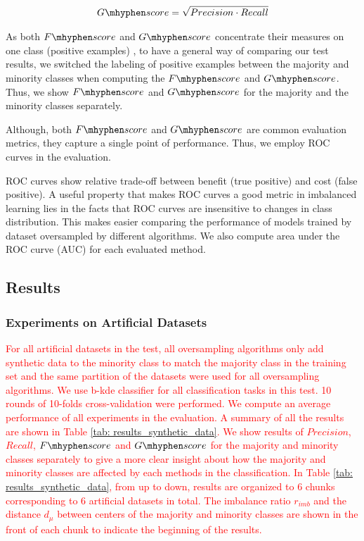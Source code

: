 \documentclass[10pt,journal,compsoc]{IEEEtran}
\newcommand\fscore{\mathop{F\mhyphen score}}
\newcommand\gscore{\mathop{G\mhyphen score}}
\begin{document}
\begin{align*}
\gscore=\sqrt{Precision \cdot Recall}
\end{align*}

As both $\fscore$ and $\gscore$ concentrate their measures on one class (positive examples) \cite{sokolova2006beyond}, to have a general way of comparing our test results, we switched the labeling of positive examples between the majority and minority classes when computing the $\fscore$ and $\gscore$. Thus, we show $\fscore$ and $\gscore$ for the majority and the minority classes separately.

Although, both $\fscore$ and $\gscore$ are common evaluation metrics, they capture a single point of performance. Thus, we employ ROC curves \cite{fawcett2004roc}\cite{fawcett2006introduction}\cite{mohri2005confidence} in the evaluation.

ROC curves show relative trade-off between benefit (true positive) and cost (false positive). A useful property that makes ROC curves a good metric in imbalanced learning lies in the facts that ROC curves are insensitive to changes in class distribution. This makes easier comparing the performance of models trained by dataset oversampled by different algorithms. We also compute area under the ROC curve (AUC) for each evaluated method.
 
 
\subsection{Results}
\subsubsection{Experiments on Artificial Datasets}
\textcolor{red}{For all artificial datasets in the test, all oversampling algorithms only add synthetic data to the minority class to match the majority class in the training set and the same partition of the datasets were used for all oversampling algorithms. We use b-kde classifier for all classification tasks in this test. 10 rounds of 10-folds cross-validation were performed. We compute an average performance of all experiments in the evaluation. A summary of all the results are shown in Table \ref{tab: results_synthetic_data}. We show results of $Precision$, $Recall$, $\fscore$ and $\gscore$ for the majority and minority classes separately to give a more clear insight about how the majority and minority classes are affected by each methods in the classification. In Table \ref{tab: results_synthetic_data}, from up to down, results are organized to 6 chunks corresponding to 6 artificial datasets in total. The imbalance ratio $r_{imb}$ and the distance $d_{\mu}$ between centers of the majority and minority classes are shown in the front of each chunk to indicate the beginning of the results.}
\end{document}
